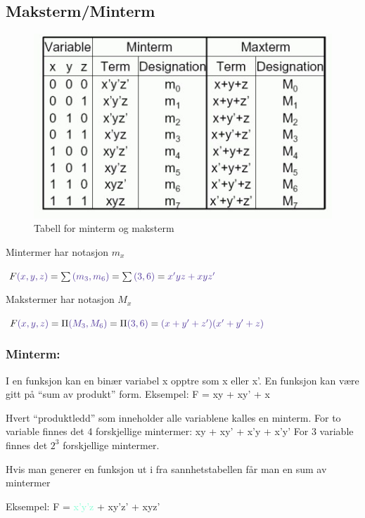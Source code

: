 \documentclass{article}
\begin{document}
	\subsection{Maksterm/Minterm}
	
	\begin{figure}[H]
		\includegraphics[scale=0.8]{maksmin.jpg}
		\caption{Tabell for minterm og maksterm}
	\end{figure}
	
	Mintermer har notasjon $m_x$
	
	$F\textcolor{Violet}{(x,y,z)} = \sum\textcolor{Violet}{(m_3, m_6)} = \sum\textcolor{Violet}{(3, 6)} = \textcolor{Violet}{ x'yz + xyz'} $
	
	Makstermer har notasjon $M_x$
	
	$F\textcolor{Violet}{(x,y,z)} = \Pi \textcolor{Violet}{(M_3, M_6)} = \Pi \textcolor{Violet}{(3, 6)} = \textcolor{Violet}{(x+y'+z')(x'+y'+z)} $
	
	\subsubsection{Minterm:}
	I en funksjon kan en binær variabel x opptre som x eller x'.	En funksjon kan være gitt på “sum av produkt” form.
	Eksempel: F = xy + xy' + x
	
	Hvert “produktledd” som inneholder alle variablene kalles en minterm. For to variable finnes det 4 forskjellige mintermer: xy + xy' + x'y + x'y'
	For 3 variable finnes det $2^3$ forskjellige mintermer. 
	
	Hvis man generer en funksjon ut i fra sannhetstabellen får man en sum av mintermer
	
	Eksempel:  F = \textcolor{Aquamarine}{x'y'z} + \textcolor{BurntOrange}{xy'z'} + \textcolor{WildStrawberry}{xyz'}
	
\end{document}
